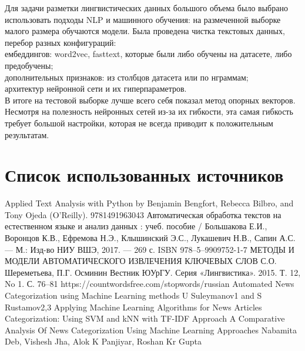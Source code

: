 \documentclass{article}
\newcommand\tab[1][1cm]{\hspace*{#1}}
\begin{document}
\tab Для задачи разметки лингвистических данных большого объема было выбрано использовать подходы NLP и машинного обучения: на размеченной выборке малого размера обучаются модели. Была проведена чистка текстовых данных, перебор разных конфигураций:\\
\tab\tab ембеддингов: word2vec, fasttext, которые были либо обучены на датасете, либо предобучены;\\
\tab\tab дополнительных признаков: из столбцов датасета или по нграммам;\\
\tab\tab архитектур нейронной сети и их гиперпараметров.\\
\tab В итоге на тестовой выборке лучше всего себя показал метод опорных векторов. Несмотря на полезность нейронных сетей из-за их гибкости, эта самая гибкость требует большой настройки, которая не всегда приводит к положительным результатам.

\newpage
{}
\section*{Список использованных источников}
\renewcommand{\refname}{}
\begin{thebibliography}{7}
 Applied Text Analysis with Python by Benjamin Bengfort, Rebecca Bilbro, and Tony Ojeda (O’Reilly). 978­1­491­96304­3
 Автоматическая обработка текстов на естественном языке и анализ данных : учеб. пособие / Большакова Е.И., Воронцов К.В., Ефремова Н.Э., Клышинский Э.С., Лукашевич Н.В., Сапин А.С. — М.: Изд-во НИУ ВШЭ, 2017. — 269 с. ISBN 978–5–9909752-1-7
МЕТОДЫ И МОДЕЛИ АВТОМАТИЧЕСКОГО ИЗВЛЕЧЕНИЯ КЛЮЧЕВЫХ СЛОВ С.О. Шереметьева, П.Г. Осминин Вестник ЮУрГУ. Серия «Лингвистика». 2015. Т. 12, No 1. С. 76–81
https://countwordsfree.com/stopwords/russian
Automated News Categorization using Machine Learning
methods
U Suleymanov1
 and S Rustamov2,3
 Applying Machine Learning Algorithms for News Articles Categorization: Using SVM and kNN with TF-IDF Approach
 A Comparative Analysis Of News Categorization
Using Machine Learning Approaches
Nabamita Deb, Vishesh Jha, Alok K Panjiyar, Roshan Kr Gupta
\end{thebibliography}
\end{document}
